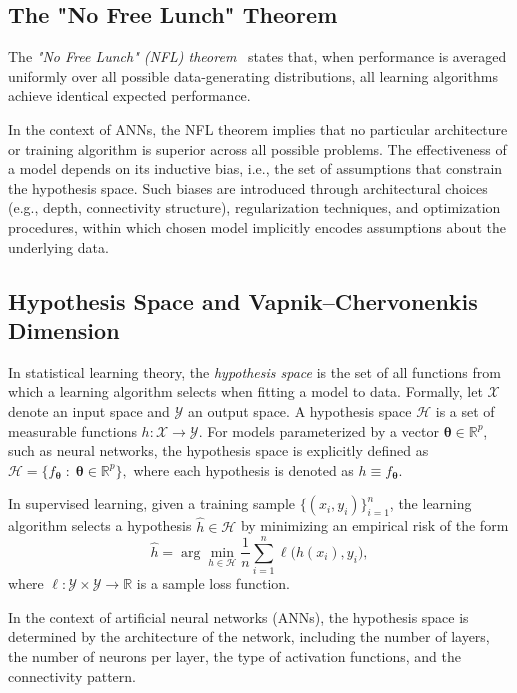 \subsection{The "No Free Lunch" Theorem}
The \emph{"No Free Lunch" (NFL) theorem}~\cite{wolpert1997} states that, when performance is averaged uniformly over all possible data-generating distributions, all learning algorithms achieve identical expected performance.

In the context of ANNs, the NFL theorem implies that no particular architecture or training algorithm is superior across all possible problems. The effectiveness of a model depends on its inductive bias, i.e., the set of assumptions that constrain the hypothesis space. Such biases are introduced through architectural choices (e.g., depth, connectivity structure), regularization techniques, and optimization procedures,  within which chosen model implicitly encodes assumptions about the underlying data.

\subsection{Hypothesis Space and Vapnik–Chervonenkis Dimension}
In statistical learning theory, the \emph{hypothesis space} is the set of all functions from which a learning algorithm selects when fitting a model to data. Formally, let $\mathcal{X}$ denote an input space and $\mathcal{Y}$ an output space. A hypothesis space $\mathcal{H}$ is a set of measurable functions $h: \mathcal{X} \to \mathcal{Y}$. For models parameterized by a vector $\boldsymbol{\theta} \in \mathbb{R}^p$, such as neural networks, the hypothesis space is explicitly defined as
$\mathcal{H} = \{ f_{\boldsymbol{\theta}} \;:\; \boldsymbol{\theta} \in \mathbb{R}^p \},$
where each hypothesis is denoted as $h \equiv f_{\boldsymbol{\theta}}$.

In supervised learning, given a training sample $\{(x_i, y_i)\}_{i=1}^n$, the learning algorithm selects a hypothesis $\hat{h} \in \mathcal{H}$ by minimizing an empirical risk of the form
\[
\hat{h} = \arg\min_{h \in \mathcal{H}} \frac{1}{n} \sum_{i=1}^{n} \ell\big(h(x_i), y_i\big),
\]
where $\ell : \mathcal{Y} \times \mathcal{Y} \to \mathbb{R}$ is a sample loss function.

In the context of artificial neural networks (ANNs), the hypothesis space is determined by the architecture of the network, including the number of layers, the number of neurons per layer, the type of activation functions, and the connectivity pattern. 

